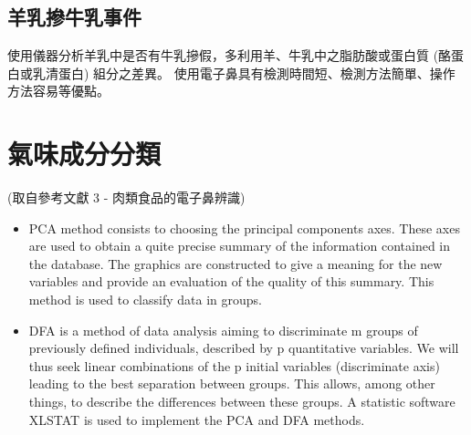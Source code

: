 	\subsection{羊乳摻牛乳事件}
	使用儀器分析羊乳中是否有牛乳摻假，多利用羊、牛乳中之脂肪酸或蛋白質 (酪蛋白或乳清蛋白) 組分之差異。
	使用電子鼻具有檢測時間短、檢測方法簡單、操作方法容易等優點。

\section{氣味成分分類}
(取自參考文獻 3 - 肉類食品的電子鼻辨識)
\begin{itemize}
	\item PCA method consists to choosing the principal components axes. 
	These axes are used to obtain a quite precise summary of the information 
	contained in the database. The graphics are constructed to give a meaning for 
	the new variables and provide an evaluation of the quality of this summary. 
	This method is used to classify data in groups. 
	\item DFA is a method of data analysis aiming to discriminate m groups of 
	previously defined individuals, described by p quantitative variables. We will 
	thus seek linear combinations of the p initial variables (discriminate axis) 
	leading to the best separation between groups. This allows, among other things, 
	to describe the differences between these groups. A statistic software XLSTAT 
	is used to implement the PCA and DFA methods. 
\end{itemize}